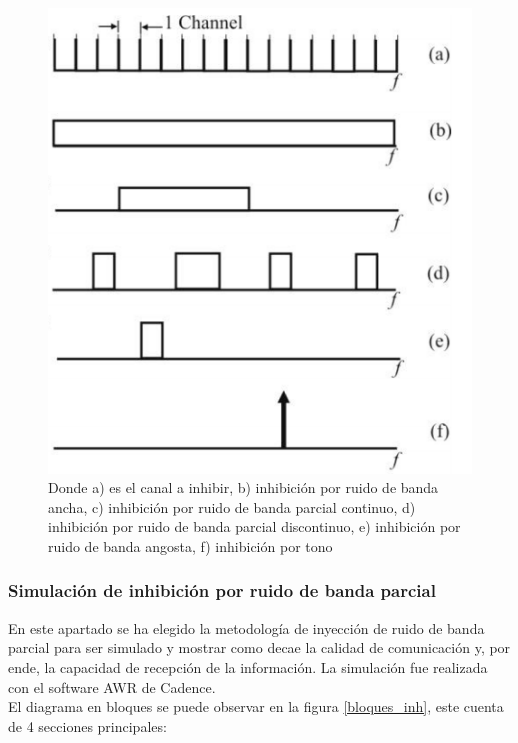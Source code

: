 \documentclass[12pt]{report}
\begin{document}
\begin{figure}[htb]
	\centering
	\includegraphics[scale=0.8]{tipos_de_jam.png}
    \caption{Donde a) es el canal a inhibir, b) inhibición por ruido de banda ancha, c) inhibición por ruido de banda parcial continuo, 
    d) inhibición por ruido de banda parcial discontinuo, e) inhibición por ruido de banda angosta, f) inhibición por tono }
	\label{tipos_de_jam}
\end{figure}

\subsubsection{Simulación de inhibición por ruido de banda parcial}

En este apartado se ha elegido la metodología de inyección de ruido de banda parcial para ser simulado y mostrar como decae la calidad de 
comunicación y, por ende, la capacidad de recepción de la información. La simulación fue realizada con el software AWR de Cadence.\\
El diagrama en bloques se puede observar en la figura \ref{bloques_inh}, este cuenta de 4 secciones principales:
\end{document}
